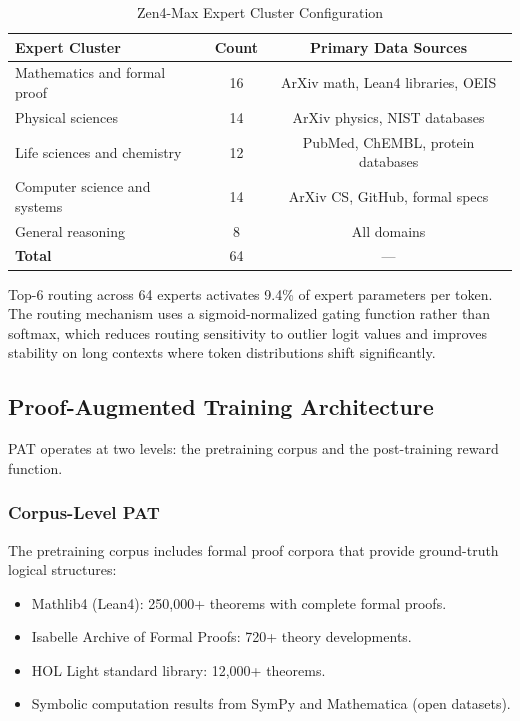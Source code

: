\documentclass[11pt,a4paper]{article}
\begin{document}
\begin{table}[H]
\centering
\begin{tabular}{lcc}
\toprule
\textbf{Expert Cluster} & \textbf{Count} & \textbf{Primary Data Sources} \\
\midrule
Mathematics and formal proof    & 16 & ArXiv math, Lean4 libraries, OEIS \\
Physical sciences               & 14 & ArXiv physics, NIST databases \\
Life sciences and chemistry     & 12 & PubMed, ChEMBL, protein databases \\
Computer science and systems    & 14 & ArXiv CS, GitHub, formal specs \\
General reasoning               & 8  & All domains \\
\midrule
\textbf{Total}                  & 64 & --- \\
\bottomrule
\end{tabular}
\caption{Zen4-Max Expert Cluster Configuration}
\end{table}

Top-6 routing across 64 experts activates 9.4\% of expert parameters per token.
The routing mechanism uses a sigmoid-normalized gating function rather than softmax,
which reduces routing sensitivity to outlier logit values and improves stability
on long contexts where token distributions shift significantly.

\subsection{Proof-Augmented Training Architecture}

PAT operates at two levels: the pretraining corpus and the post-training reward function.

\subsubsection{Corpus-Level PAT}

The pretraining corpus includes formal proof corpora that provide ground-truth logical
structures:

\begin{itemize}
    \item Mathlib4 (Lean4): 250,000+ theorems with complete formal proofs.
    \item Isabelle Archive of Formal Proofs: 720+ theory developments.
    \item HOL Light standard library: 12,000+ theorems.
    \item Symbolic computation results from SymPy and Mathematica (open datasets).
\end{itemize}
\end{document}
